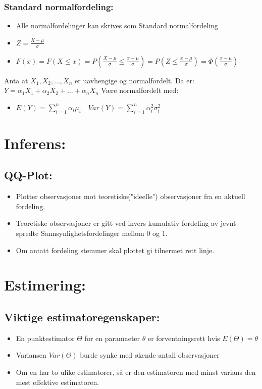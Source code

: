 \documentclass[12pt,a4paper,twocolumn,twoside]{article}
\begin{document}
\subsubsection*{Standard normalfordeling:}
\begin{itemize}[topsep=0pt,itemsep=0pt, partopsep=0pt]
    \item Alle normalfordelinger kan skrives som Standard normalfordeling
    \item $Z=\frac{X-\mu}{\sigma}$
    \item $F(x)=F(X\leq x) = P\left(\frac{X-\mu}{\sigma}\leq\frac{x-\mu}{\sigma}\right)=P\left( Z\leq \frac{x-\mu}{\sigma} \right)=\Phi\left(\frac{x-\mu}{\sigma}\right)$ 
\end{itemize}
Anta at $X_1,X_2,\dots,X_n$ er uavhengige og normalfordelt. Da er:
$Y=\alpha_1 X_1+\alpha_2 X_2+\dots+\alpha_n X_n$
Være normalfordelt med:
\begin{itemize}[topsep=0pt,itemsep=0pt, partopsep=0pt]
    \item $E(Y)=\sum_{i=1}^n \alpha_i \mu_i\quad Var(Y)=\sum_{i=1}^n \alpha^2_i\sigma^2_i$
\end{itemize}


%
%
\section*{Inferens:}
%
%
\subsection*{QQ-Plot:}
\begin{itemize}[topsep=0pt,itemsep=0pt, partopsep=0pt]
    \item Plotter observasjoner mot teoretiske("ideelle") observasjoner fra en aktuell fordeling.
    \item Teoretiske observasjoner er gitt ved invers kumulativ fordeling av jevnt spredte Sannsynlighetsfordelinger
          mellom 0 og 1.
    \item Om antatt fordeling stemmer skal plottet gi tilnermet rett linje.
\end{itemize}
%
%
\section*{Estimering:}
%
%
\subsection*{Viktige estimatoregenskaper:}
\begin{itemize}[topsep=0pt,itemsep=0pt, partopsep=0pt]
    \item En punktestimator $\Theta$ for en paramaeter $\theta$ er forventningsrett hvis $E(\Theta)=\theta$
    \item Variansen $Var(\Theta)$ burde synke med økende antall observasjoner
    \item Om en har to ulike estimatorer, så er den estimatoren med minst varians den mest effektive estimatoren.
\end{itemize}
%
%
\end{document}
